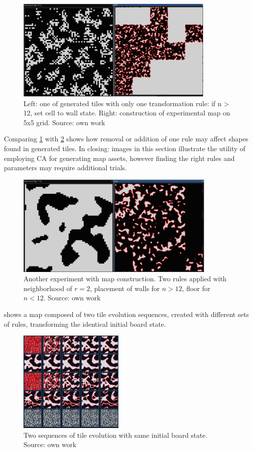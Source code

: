 \documentclass[12pt]{report}
\begin{document}
\begin{figure}[th]
	\centering
	\includegraphics[height=5cm]{images/r2ex1}
	\caption{Left: one of generated tiles with only one transformation rule: if n > 12, set cell to wall state. Right: construction of experimental map on 5x5 grid. Source: own work}
	\label{fig:r2ex1}
\end{figure}

Comparing \cref{fig:r2ex1} with \cref{fig:ex3rst2} shows how removal or addition of one rule may affect shapes found in generated tiles. In closing: images in this section illustrate the utility of employing CA for generating map assets, however finding the right rules and parameters may require additional trials.

\begin{figure}[th]
	\centering
	\includegraphics[height=5cm]{images/ex3rst2}
	\caption{Another experiment with map construction. Two rules applied with neighborhood of $r = 2$, placement of walls for $n > 12$, floor for $n < 12$. Source: own work}
	\label{fig:ex3rst2}
\end{figure}

 shows a map composed of two tile evolution sequences, created with different sets of rules, transforming the identical initial board state.

\begin{figure}[H]
	\centering
	\includegraphics[height=5cm]{images/ex2sequences}
	\caption{Two sequences of tile evolution with same initial board state. Source: own work}
	\label{fig:seqr2r3}
\end{figure}
\end{document}
